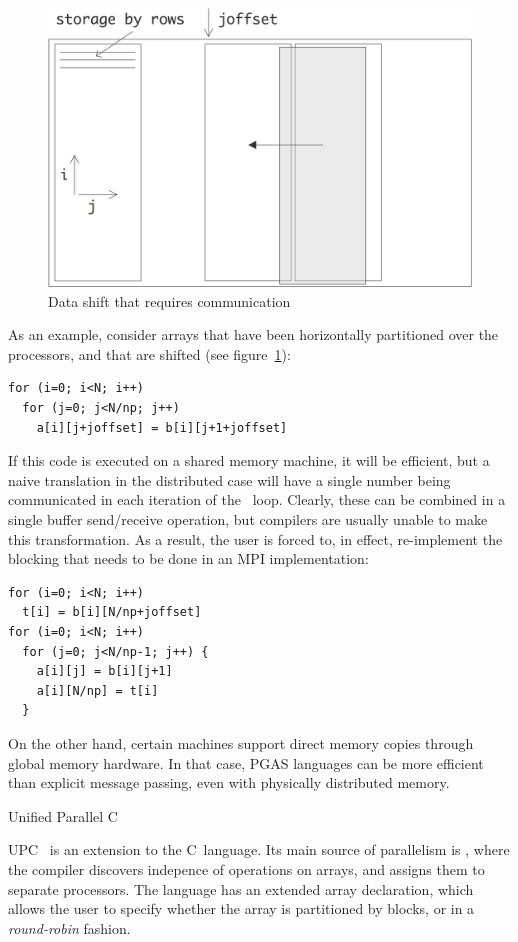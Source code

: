 \begin{figure}[ht]
  \includegraphics[scale=.12]{graphics/abshift}
  \caption{Data shift that requires communication}
  \label{fig:abshift}
\end{figure}
As an example, consider arrays  that have been horizontally
partitioned over the processors, and that are shifted (see figure~\ref{fig:abshift}):
\begin{verbatim}
for (i=0; i<N; i++)
  for (j=0; j<N/np; j++)
    a[i][j+joffset] = b[i][j+1+joffset]
\end{verbatim}
If this code is executed on a shared memory machine, it will be
efficient, but a naive translation in the distributed case will have a
single number being communicated in each iteration of the
~loop. Clearly, these can be combined in a single buffer
send/receive operation, but compilers are usually
unable to make this transformation. As a result, the user is forced
to, in effect, re-implement the blocking that needs to be done in an
MPI implementation:
\begin{verbatim}
for (i=0; i<N; i++)
  t[i] = b[i][N/np+joffset]
for (i=0; i<N; i++)
  for (j=0; j<N/np-1; j++) {
    a[i][j] = b[i][j+1]
    a[i][N/np] = t[i]
  }
\end{verbatim}

On the other hand, certain machines support direct memory copies
through global memory hardware. In that case, \ac{PGAS} languages can
be more efficient than explicit message passing, even with physically
distributed memory.

 {Unified Parallel C}

\acf{UPC}~\cite{UPC:homepage} is an extension to the C~language.  Its
main source of parallelism is , where
the compiler discovers indepence of operations on
arrays, and assigns them to separate processors. The language has an
extended array declaration, which allows the user to specify whether
the array is partitioned by blocks, or in a
\emph{round-robin}
fashion.

